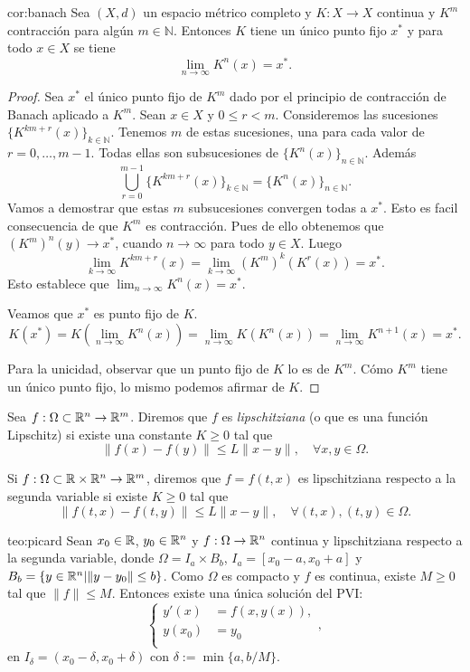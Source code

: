 \begin{corolario}{cor:banach}  Sea $(X,d)$ un espacio métrico completo y $K:X\to X$ continua y $K^m$ contracción para algún $m\in\mathbb{N}$. Entonces $K$ tiene un único punto fijo $x^*$ y para todo $x\in X$ se tiene
\[ \lim_{n\to\infty} K^n(x)=x^*.\]
 \end{corolario}
 
 \begin{proof} Sea $x^*$ el único punto fijo de $K^m$ dado por el principio de contracción de Banach aplicado a $K^m$. Sean $x\in X$ y $0\leq r<m$. Consideremos las sucesiones $\{K^{km+r}(x)\}_{k\in\mathbb{N}}$. Tenemos $m$ de estas sucesiones, una para cada valor de $r=0,\ldots,m-1$. Todas ellas son subsucesiones de $\{K^n(x)\}_{n\in\mathbb{N}}$. Además 
  \[\bigcup_{r=0}^{m-1}\{K^{km+r}(x)\}_{k\in\mathbb{N}}=\{K^n(x)\}_{n\in\mathbb{N}}.\]
  Vamos a demostrar que estas $m$ subsucesiones convergen todas a $x^*$. Esto es facil consecuencia de que $K^m$ es contracción. Pues de ello obtenemos que $\left(K^{m}\right)^n(y)\to x^*$, cuando $n\to\infty$ para todo $y\in X$. Luego
  \[\lim_{k\to\infty}K^{km+r}(x)=\lim_{k\to\infty}\left(K^{m}\right)^k(K^r(x))=x^*.\]
  Esto establece que $ \lim_{n\to\infty} K^n(x)=x^*$.
  
  Veamos que $x^*$ es punto fijo de $K$. 
  \[K(x^*)=K\left(\lim_{n\to\infty} K^{n}(x)\right)=\lim_{n\to\infty} K\left( K^{n}(x)\right)
  =\lim_{n\to\infty}  K^{n+1}(x)=x^*.\]
  
  Para la unicidad, observar que un punto fijo de $K$ lo es de $K^m$. Cómo $K^m$ tiene un único punto fijo, lo mismo podemos afirmar de $K$.
  
 \end{proof}


\begin{definicion} Sea $f:\Omega \subset \rr^n\to \rr^m$. Diremos que $f$ es \emph{lipschitziana} (o que es una función Lipschitz) si existe una constante $K\geq 0$ tal que
\[\|f(x)-f(y)\|\leq L\|x-y\|,\quad \forall x,y\in \Omega .\]

Si $f:\Omega\subset\rr\times \rr^n\to\rr^m$, diremos que $f=f(t,x)$ es lipschitziana respecto a la segunda variable si existe  $K\geq 0$ tal que
\[\|f(t,x)-f(t,y)\|\leq L\|x-y\|,\quad \forall (t,x),(t,y)\in \Omega .\]
 
\end{definicion}



\begin{teorema}{teo:picard} Sean $x_0\in\rr$, $y_0\in\rr^n$ y $f:\Omega\to\rr^n$ continua y lipschitziana respecto a la segunda variable, donde $\Omega=I_a\times B_b$,  $I_a=[x_0-a,x_0+a]$ y $B_b=\{y\in\rr^n|\|y-y_0\|\leq b\}$. Como $\Omega$ es compacto y $f$ es continua, existe $M\geq 0$ tal que $\|f\|\leq M$. Entonces existe una única solución del PVI:
\[
 \left\{\begin{array}{ll}
	  y'(x)&=f(x,y(x)),\\
	  y(x_0)&=y_0\\         
        \end{array}
\right. ,
\]
en $I_{\delta}=(x_0-\delta,x_0+\delta)$ con $\delta:=\min\{a,b/M\}$.
 \end{teorema}

